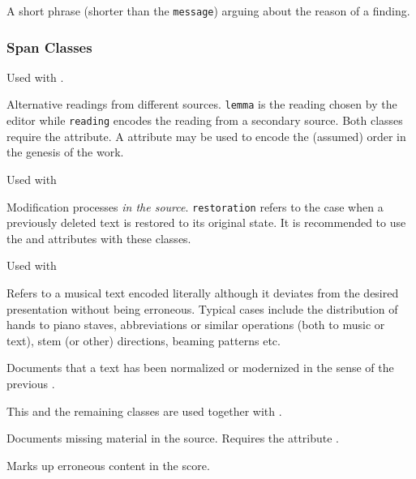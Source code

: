 \documentclass[]{ollmanual}
\begin{document}

A short phrase (shorter than the \texttt{message}) arguing about the
reason of a finding.

\hypertarget{span-classes}{%
\subsubsection{Span Classes}\label{span-classes}}


Used with .

Alternative readings from different sources. \texttt{lemma} is the
reading chosen by the editor while \texttt{reading} encodes the reading
from a secondary source. Both classes require the 
attribute. A  attribute may be used to encode the
(assumed) order in the genesis of the work.


Used with 

Modification processes \emph{in the source}. \texttt{restoration} refers
to the case when a previously deleted text is restored to its original
state. It is recommended to use the  and
 attributes with these classes.


Used with 

Refers to a musical text encoded literally although it deviates from the
desired presentation without being erroneous. Typical cases include the
distribution of hands to piano staves, abbreviations or similar
operations (both to music or text), stem (or other) directions, beaming
patterns etc.


Documents that a text has been normalized or modernized in the sense of
the previous .


This and the remaining classes are used together with
.

Documents missing material in the source. Requires the attribute
.


Marks up erroneous content in the score.
\end{document}
